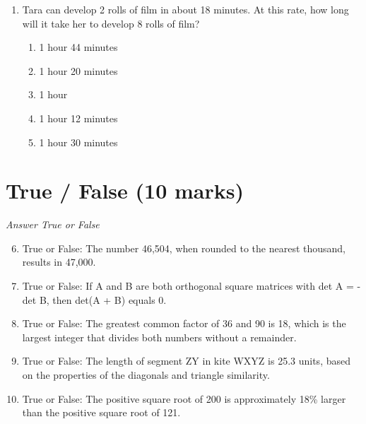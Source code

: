 \documentclass[12pt]{article}
\begin{document}
\begin{enumerate}[label=\arabic*.]
\begin{enumerate}[label=(\alph*)]
    \item The sets have identical medians.
    \item The sets have identical means.
    \item The sets have identical ranges.
    \item None of the above are false.
\end{enumerate}
\item Tara can develop 2 rolls of film in about 18 minutes. At this rate, how long will it take her to develop 8 rolls of film?
\begin{enumerate}[label=(\alph*)]
    \item 1 hour 44 minutes
    \item 1 hour 20 minutes
    \item 1 hour
    \item 1 hour 12 minutes
    \item 1 hour 30 minutes
\end{enumerate}
\end{enumerate}

\section*{True / False (10 marks)}
\textit{Answer True or False}
\begin{enumerate}[label=\arabic*.]
\setcounter{enumi}{5}
\item True or False: The number 46,504, when rounded to the nearest thousand, results in 47,000.
\item True or False: If A and B are both orthogonal square matrices with det A = -det B, then det(A + B) equals 0.
\item True or False: The greatest common factor of 36 and 90 is 18, which is the largest integer that divides both numbers without a remainder.
\item True or False: The length of segment ZY in kite WXYZ is 25.3 units, based on the properties of the diagonals and triangle similarity.
\item True or False: The positive square root of 200 is approximately 18\% larger than the positive square root of 121.
\end{enumerate}
\end{document}
